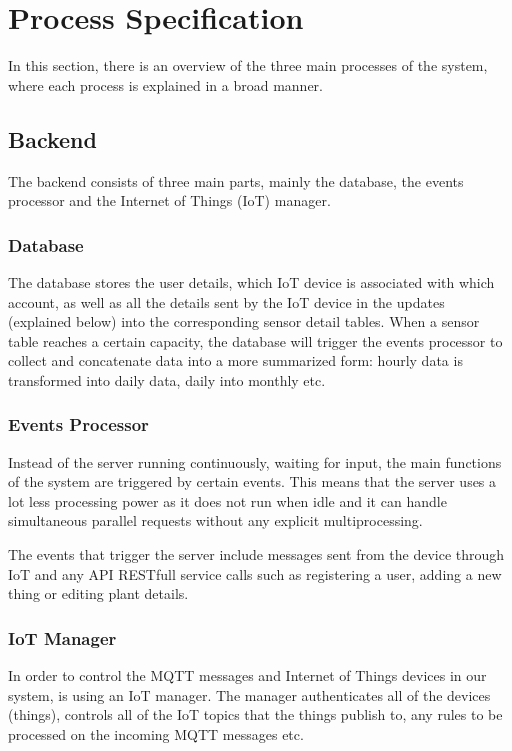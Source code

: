 \documentclass{article}
\begin{document}
\section{Process Specification}
	In this section, there is an overview of the three main processes of the system, where each process is explained in a broad manner.
	
	\subsection{Backend}
		The backend consists of three main parts, mainly the database, the events processor and the Internet of Things (IoT) manager.
		
		\subsubsection{Database}
			
			The database stores the user details, which IoT device is associated with which account, as well as all the details sent by the IoT device in the updates (explained below) into the corresponding sensor detail tables. When a sensor table reaches a certain capacity, the database will trigger the events processor to collect and concatenate data into a more summarized form: hourly data is transformed into daily data, daily into monthly etc.
		
		\subsubsection{Events Processor}
			
			Instead of the server running continuously, waiting for input, the main functions of the system are triggered by certain events. This means that the server uses a lot less processing power as it does not run when idle and it can handle simultaneous parallel requests without any explicit multiprocessing.
			
			The events that trigger the server include messages sent from the device through IoT and any API RESTfull service calls such as registering a user, adding a new thing or editing plant details. 
			
		\subsubsection{IoT Manager}
		
			In order to control the MQTT messages and Internet of Things devices in our system,  is using an IoT manager. The manager authenticates all of the devices (things), controls all of the IoT topics that the things publish to, any rules to be processed on the incoming MQTT messages etc.
		
\end{document}
